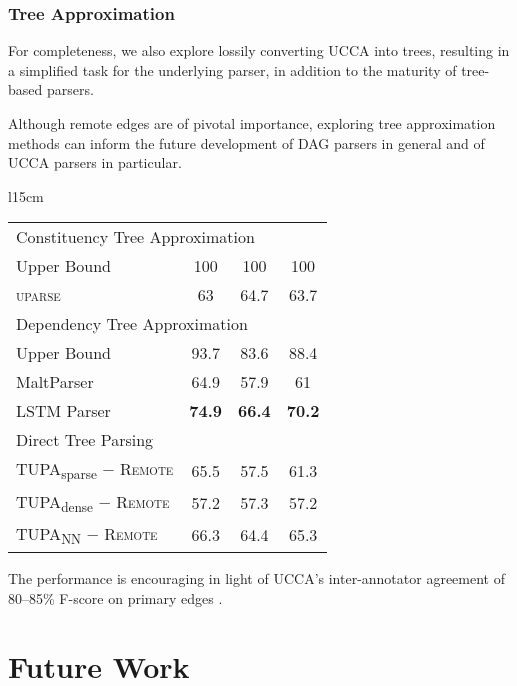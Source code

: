 \documentclass[t]{beamer}
\newcommand{\parser}[1]{TUPA\textsubscript{#1}}
\begin{document}
\begin{frame}
\frametitle{Tree Approximation}
For completeness, we also explore lossily converting UCCA into trees,
resulting in a simplified task for the underlying parser,
in addition to the maturity of tree-based parsers.

Although remote edges are of pivotal importance, exploring tree approximation methods
can inform the future development of DAG parsers in general and of UCCA parsers in particular.
\begin{wraptable}[11]{l}{15cm}
\hspace{-6mm}
\begin{tabular}{l|ccc}
\hline
\multicolumn{4}{l}{\rule{0pt}{2ex} \footnotesize Constituency Tree Approximation} \\
Upper Bound & 100 & 100 & 100 \vspace{.1cm} \\
\textsc{uparse} \cite{maier-lichte:2016:DiscoNLP} & 63 & 64.7 & 63.7 \\
\hline
\multicolumn{4}{l}{\rule{0pt}{2ex} \footnotesize Dependency Tree Approximation} \\
Upper Bound & 93.7 & 83.6 & 88.4 \vspace{.1cm} \\
MaltParser \cite{nivre2007maltparser} & 64.9 & 57.9 & 61 \\
LSTM Parser \cite{dyer2015transition} & {\bf 74.9} & {\bf 66.4} & {\bf 70.2} \\
\hline
\multicolumn{4}{l}{\rule{0pt}{2ex} \footnotesize Direct Tree Parsing} \\
\parser{sparse} $-$ \textsc{Remote} & 65.5 & 57.5 & 61.3 \\
\parser{dense} $-$ \textsc{Remote} & 57.2 & 57.3 & 57.2 \\
\parser{NN} $-$ \textsc{Remote} & 66.3 & 64.4 & 65.3 \\
\end{tabular}
\end{wraptable}

The performance is encouraging in light of
UCCA's inter-annotator agreement of 80--85\%
F-score on primary edges \cite{abend2013universal}.
\end{frame}



\section{Future Work}
\end{document}
